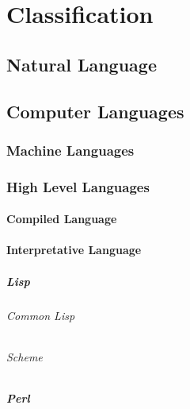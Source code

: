 \part{Classification} 
    \chapter{Natural Language} 
    \chapter{Computer Languages} 
        \section{Machine Languages} 
        \section{High Level Languages}
            \subsection{Compiled Language}
            \subsection{Interpretative Language}
                \subsubsection{Lisp}
                    \paragraph{Common Lisp}
                    \paragraph{Scheme}
                \subsubsection{Perl}